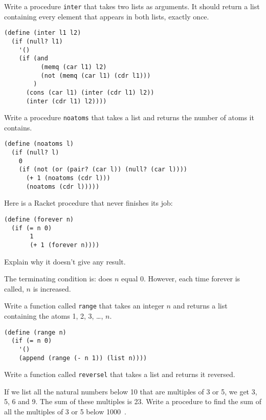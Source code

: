 \begin{questions}
\question
Write a procedure \texttt{inter} that takes two lists as arguments.
It should return a list containing every element that appears in both lists, exactly once.

\begin{solution}
  \begin{verbatim}
(define (inter l1 l2)
  (if (null? l1)
    '()
    (if (and 
          (memq (car l1) l2)
          (not (memq (car l1) (cdr l1)))
        )
      (cons (car l1) (inter (cdr l1) l2))
      (inter (cdr l1) l2))))
  \end{verbatim}
\end{solution}

\question
Write a procedure \texttt{noatoms} that takes a list and returns the number of atoms it contains.

\begin{solution}
  \begin{verbatim}
(define (noatoms l)
  (if (null? l)
    0
    (if (not (or (pair? (car l)) (null? (car l))))
      (+ 1 (noatoms (cdr l)))
      (noatoms (cdr l)))))
  \end{verbatim}
\end{solution}

\question
Here is a Racket procedure that never finishes its job:
\begin{verbatim}
(define (forever n)
  (if (= n 0)
       1
       (+ 1 (forever n))))
\end{verbatim}
Explain why it doesn’t give any result\cite{simplyscheme}.

\begin{solution}
The terminating condition is: does $n$ equal 0.
However, each time forever is called, $n$ is increased.
\end{solution}

\question
Write a function called \texttt{range} that takes an integer $n$ and returns a list containing the atoms 1, 2, 3, \ldots, $n$.

\begin{solution}
\begin{verbatim}
(define (range n)
  (if (= n 0)
    '()
    (append (range (- n 1)) (list n))))
\end{verbatim}
\end{solution}

\question
Write a function called \texttt{reversel} that takes a list and returns it reversed.  

\question
If we list all the natural numbers below 10 that are multiples of 3 or 5, we get 3, 5, 6 and 9.
The sum of these multiples is 23.
Write a procedure to find the sum of all the multiples of 3 or 5 below 1000~\cite{projecteuler}.


\end{questions}
